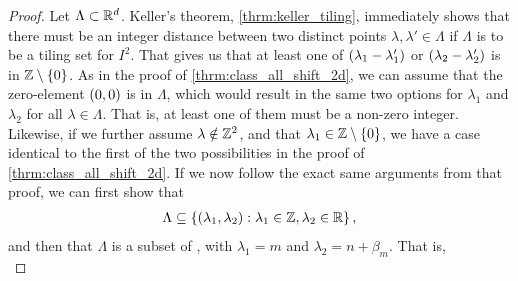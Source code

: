 \documentclass[../thesis.tex]{subfiles}
\begin{document}
\begin{proof}  %

    Let $\Lambda \subset \mathbb{R}^d$. Keller's theorem, \cref{thrm:keller_tiling}, immediately shows that there must be an integer distance between two distinct points $\lambda,\lambda' \in \Lambda$ if $\Lambda$ is to be a tiling set for $I^2$. That gives us that at least one of $(\lambda_1-\lambda_1')$ or $(\lambda_2-\lambda_2')$ is in $\mathbb{Z}\setminus\{0\}$. As in the proof of \cref{thrm:class_all_shift_2d}, we can assume that the zero-element $(0,0)$ is in $\Lambda$, which would result in the same two options for $\lambda_1$ and $\lambda_2$ for all $\lambda\in \Lambda$. That is, at least one of them must be a non-zero integer. Likewise, if we further assume $\lambda\notin \mathbb{Z}^2$, and that $\lambda_1 \in\mathbb{Z}\setminus\{0\}$, we have a case identical to the first of the two possibilities in the proof of \cref{thrm:class_all_shift_2d}. If we now follow the exact same arguments from that proof, we can first show that 
    \begin{align*}  %
        \Lambda \subseteq \braqMed{ \bracMed{\lambda_1, \lambda_2} : \lambda_1 \in \Z, \lambda_2 \in \R},
    \end{align*}
    and then that $\Lambda$ is a subset of , with $\lambda_1 = m$ and $\lambda_2 = n+\beta_m$. That is,
    \begin{equation*}  %

\end{equation*}
\end{proof}
\end{document}
